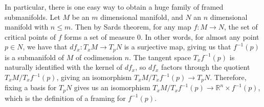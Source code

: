 \documentclass[psamsfonts]{amsart}
\theoremstyle{definition}
\theoremstyle{remark}
\newcommand{\R}{\mathbb{R}}
\newcommand{\inv}{^{-1}}
\begin{document}
In particular, there is one easy way to obtain a huge family of framed submanifolds. Let $M$ be an $m$ dimensional manifold, and $N$ an $n$ dimensional manifold with $n \leq m$. Then by Sards theorem, for any map $f : M \to N$, the set of critical points of $f$ forms a set of measure $0$. In other words, for almost any point $p \in N$, we have that $df_x : T_xM \to T_pN$ is a surjective map, giving us that $f\inv(p)$ is a submanifold of $M$ of codimension $n$. The tangent space $T_xf\inv(p)$ is naturally identified with the kernel of $df_x$, so $df_x$ factors through the quotient $T_xM / T_xf\inv(p)$, giving an isomorphism $T_xM / T_xf\inv(p) \to T_pN$. Therefore, fixing a basis for $T_pN$ gives us an isomorphism $T_xM / T_xf\inv(p) \to \R^n \times f\inv(p)$, which is the definition of a framing for $f\inv(p)$.
%
\setcounter{section}{3}
%
\setcounter{thm}{0}
%
\end{document}
